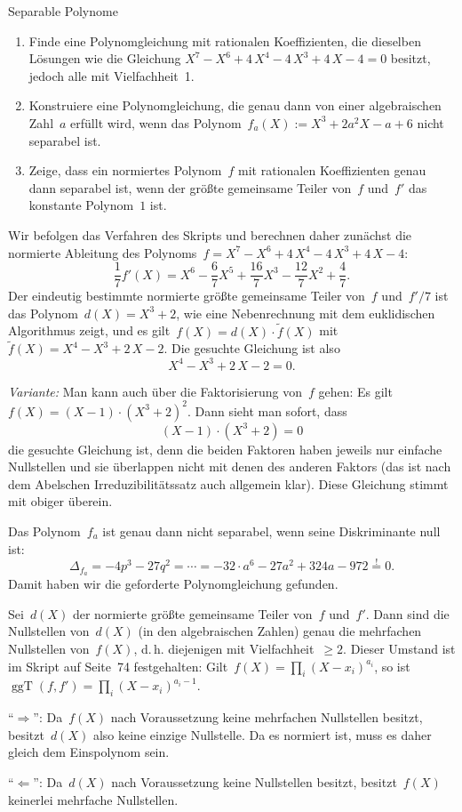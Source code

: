 \documentclass{algblatt}
\begin{document}
\begin{aufgabe}{Separable Polynome}
\begin{enumerate}
\item Finde eine Polynomgleichung mit rationalen
Koeffizienten, die dieselben Lösungen wie die
Gleichung $X^7-X^6+4\,X^4-4\,X^3+4\,X-4=0$ besitzt, jedoch alle mit
Vielfachheit~1.
\item Konstruiere eine Polynomgleichung, die genau dann
von einer algebraischen Zahl~$a$ erfüllt wird, wenn das Polynom~$f_a(X) := X^3
+ 2a^2 X - a + 6$ nicht separabel ist.
\item Zeige, dass ein normiertes Polynom~$f$ mit rationalen Koeffizienten genau
dann separabel ist, 
wenn der größte gemeinsame Teiler von~$f$
und~$f'$ das konstante Polynom~$1$ ist.
\end{enumerate}

\begin{loesungE}
\item Wir befolgen das Verfahren des Skripts und berechnen daher zunächst die
normierte Ableitung des Polynoms~$f = X^7-X^6+4\,X^4-4\,X^3+4\,X-4$:
\[ \frac{1}{7} f'(X) = X^6 - \frac{6}{7} X^5 + \frac{16}{7} X^3 - \frac{12}{7}
X^2 + \frac{4}{7}. \]
Der eindeutig bestimmte normierte größte gemeinsame Teiler von~$f$ und~$f'/7$
ist das Polynom~$d(X) = X^3 + 2$, wie eine Nebenrechnung mit dem euklidischen
Algorithmus zeigt, und es gilt~$f(X) = d(X) \cdot \widetilde f(X)$
mit~$\widetilde f(X) = X^4 - X^3 + 2\,X - 2$. Die gesuchte Gleichung ist also
\[ X^4 - X^3 + 2\,X - 2 = 0. \]

\emph{Variante:} Man kann auch über die Faktorisierung von~$f$ gehen:
Es gilt~$f(X) = (X-1) \cdot (X^3 + 2)^2$. Dann
sieht man sofort, dass
\[ (X-1) \cdot (X^3 + 2) = 0 \]
die gesuchte Gleichung ist, denn die beiden Faktoren haben jeweils nur einfache
Nullstellen und sie überlappen nicht mit denen des anderen Faktors (das ist
nach dem Abelschen Irreduzibilitätssatz auch allgemein klar). Diese Gleichung
stimmt mit obiger überein.

\item Das Polynom~$f_a$ ist genau dann nicht separabel, wenn seine Diskriminante null
ist:
\[ \Delta_{f_a} = -4p^3 - 27q^2 = \cdots =
  -32 \cdot a^6 - 27 a^2 + 324 a - 972 \stackrel{!}{=} 0. \]
Damit haben wir die geforderte Polynomgleichung gefunden.

\item Sei~$d(X)$ der normierte größte gemeinsame Teiler
von~$f$ und~$f'$. Dann sind die Nullstellen von~$d(X)$ (in den algebraischen
Zahlen) genau die mehrfachen Nullstellen von~$f(X)$, d.\,h. diejenigen mit
Vielfachheit~$\geq 2$. Dieser Umstand ist im Skript auf Seite~74 festgehalten:
Gilt~$f(X) = \prod_i (X-x_i)^{a_i}$, so ist~$\operatorname{ggT}(f, f') =
\prod_i (X-x_i)^{a_i - 1}$.

"`$\Longrightarrow$"': Da~$f(X)$ nach Voraussetzung keine mehrfachen
Nullstellen besitzt, besitzt~$d(X)$ also keine einzige Nullstelle. Da es
normiert ist, muss es daher gleich dem Einspolynom sein.

"`$\Longleftarrow$"': Da~$d(X)$ nach Voraussetzung keine Nullstellen besitzt,
besitzt~$f(X)$ keinerlei mehrfache Nullstellen.
\end{loesungE}
\end{aufgabe}
\end{document}
